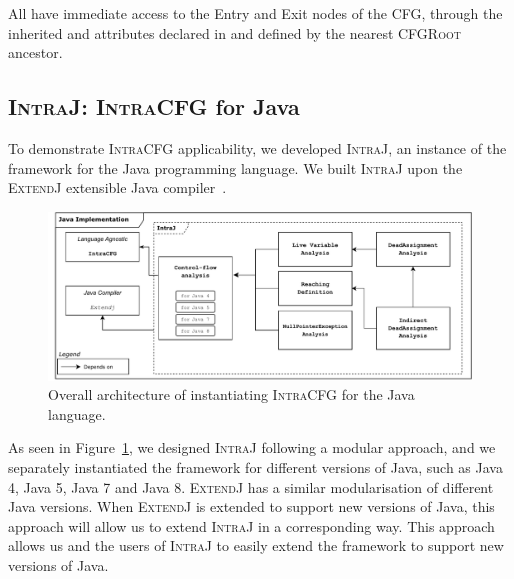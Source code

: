 All  have immediate access to the Entry and Exit nodes of the 
CFG, through the inherited  and  attributes declared in  and 
defined by the nearest \textsc{CFGRoot} ancestor.



\subsection{\textsc{IntraJ}: \textsc{IntraCFG} for Java}
\label{sec:IntraJ}
To demonstrate \textsc{IntraCFG} applicability, we developed
\textsc{IntraJ}, an instance of the framework for the Java programming language.
We built \textsc{IntraJ} upon the \textsc{ExtendJ} extensible Java compiler~\cite{DBLP:conf/oopsla/EkmanH07}.
\begin{figure}[H]
    \centering
    \includegraphics[scale=0.52]{kappa/img/architecturejava.pdf}
    \caption{\label{fig:intraJ} Overall architecture of instantiating \textsc{IntraCFG} for the Java language.}
\end{figure}

As seen in Figure~\ref{fig:intraJ}, we designed \textsc{IntraJ}
following a  modular approach, and we separately
instantiated the framework for different versions of Java, such as Java 4,
Java 5, Java 7 and Java 8.
\textsc{ExtendJ} has a similar modularisation of different Java versions.
When \textsc{ExtendJ} is extended to support new versions of Java, this approach
will allow us to extend \textsc{IntraJ} in a corresponding way.
This approach allows us and the users of \textsc{IntraJ}
to easily extend the framework to support new versions of Java.

